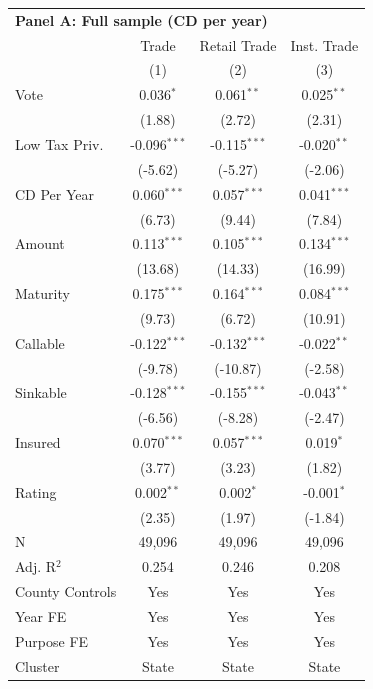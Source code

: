 \begingroup
\centering
\begin{tabular*}{\textwidth}{@{\extracolsep{\fill}}lccc}
\multicolumn{5}{l}{\textbf{Panel A: Full sample (CD per year)}}\\

\addlinespace
   \toprule
                   & Trade          & Retail Trade   & Inst. Trade\\  
                   & (1)            & (2)            & (3)\\  
   \midrule 
   Vote            & 0.036$^{*}$    & 0.061$^{**}$   & 0.025$^{**}$\\   
                   & (1.88)        & (2.72)        & (2.31)\\   
   Low Tax Priv.   & -0.096$^{***}$ & -0.115$^{***}$ & -0.020$^{**}$\\   
                   & (-5.62)       & (-5.27)       & (-2.06)\\   
   CD Per Year     & 0.060$^{***}$  & 0.057$^{***}$  & 0.041$^{***}$\\   
                   & (6.73)        & (9.44)        & (7.84)\\   
   Amount          & 0.113$^{***}$  & 0.105$^{***}$  & 0.134$^{***}$\\   
                   & (13.68)       & (14.33)       & (16.99)\\   
   Maturity        & 0.175$^{***}$  & 0.164$^{***}$  & 0.084$^{***}$\\   
                   & (9.73)        & (6.72)        & (10.91)\\   
   Callable        & -0.122$^{***}$ & -0.132$^{***}$ & -0.022$^{**}$\\   
                   & (-9.78)       & (-10.87)      & (-2.58)\\   
   Sinkable        & -0.128$^{***}$ & -0.155$^{***}$ & -0.043$^{**}$\\   
                   & (-6.56)       & (-8.28)       & (-2.47)\\   
   Insured         & 0.070$^{***}$  & 0.057$^{***}$  & 0.019$^{*}$\\   
                   & (3.77)        & (3.23)        & (1.82)\\   
   Rating          & 0.002$^{**}$   & 0.002$^{*}$    & -0.001$^{*}$\\   
                   & (2.35)        & (1.97)        & (-1.84)\\   
   \hline
   N    & 49,096         & 49,096         & 49,096\\  
   Adj. R$^2$  & 0.254          & 0.246          & 0.208\\  
   County Controls & Yes            & Yes            & Yes\\  
   Year FE         & Yes            & Yes            & Yes\\  
   Purpose FE      & Yes            & Yes            & Yes\\  
   Cluster              & State & State & State\\  
   \bottomrule
\end{tabular*}
\par\endgroup
